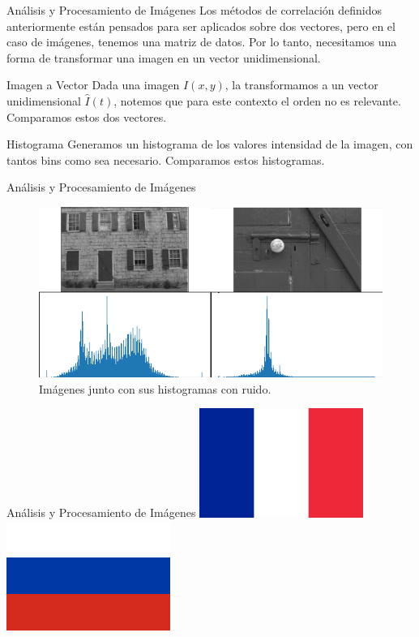 \documentclass{beamer}
\begin{document}
\begin{frame}{Análisis y Procesamiento de Imágenes}
    Los métodos de correlación definidos anteriormente están pensados para ser aplicados sobre dos vectores, pero en el caso de imágenes, tenemos una matriz de datos. 
    \pause
    Por lo tanto, necesitamos una forma de transformar una imagen en un vector unidimensional.
    \pause
    \begin{block}{Imagen a Vector}
        Dada una imagen $I(x, y)$, la transformamos a un vector unidimensional  $\hat{I}(t)$, notemos que para este contexto el orden no es relevante. Comparamos estos dos vectores.
    \end{block}
    \pause
    \begin{block}{Histograma}
        Generamos un histograma de los valores intensidad de la imagen, con tantos bins como sea necesario. Comparamos estos histogramas.
    \end{block}
\end{frame}

\begin{frame}{Análisis y Procesamiento de Imágenes}
    \begin{figure}[H]
        \centering
        \includegraphics[width=\textwidth]{img_hist.png}
        \caption{Imágenes junto con sus histogramas con ruido.}
    \end{figure}
\end{frame}

\begin{frame}{Análisis y Procesamiento de Imágenes}
    \includegraphics[width=0.4\textwidth]{Flag_of_France.png}
    \hfill
    \includegraphics[width=0.4\textwidth]{Flag_of_Russia.png}
\end{frame}
\end{document}
